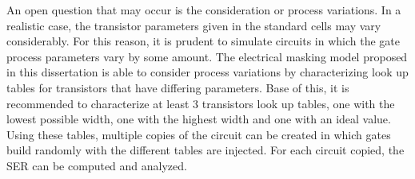 An open question that may occur is the consideration or process variations. In a realistic case, the transistor parameters given in the standard cells may vary considerably. For this reason, it is prudent to simulate circuits in which the gate process parameters vary by some amount. The electrical masking model proposed in this dissertation is able to consider process variations by characterizing look up tables for transistors that have differing parameters. Base of this, it is recommended to characterize at least 3 transistors look up tables, one with the lowest possible width, one with the highest width and one with an ideal value. Using these tables, multiple copies of the circuit can be created in which gates build randomly with the different tables are injected. For each circuit copied, the SER can be computed and analyzed.